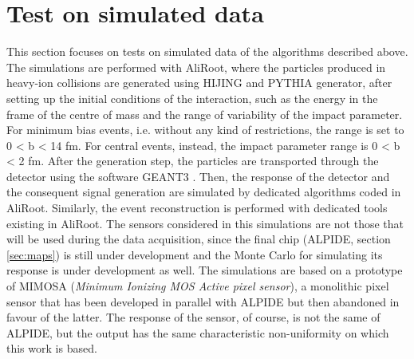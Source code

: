 \section{Test on simulated data}
This section focuses on tests on simulated data of the algorithms described above. The simulations are performed with AliRoot, where the particles produced in heavy-ion collisions are generated using HIJING \cite{hijing} and PYTHIA \cite{pythia} generator, after setting up the initial conditions of the interaction, such as the energy in the frame of the centre of mass and the range of variability of the impact parameter. For minimum bias events, i.e. without any kind of restrictions, the range is set to 0 < b < 14 fm. For central events, instead, the impact parameter range is 0 < b < 2 fm. After the generation step, the particles are transported through the detector using the software GEANT3 \cite{geant}. Then, the response of the detector and the consequent signal generation are simulated by dedicated algorithms coded in AliRoot. Similarly, the event reconstruction is performed with dedicated tools existing in AliRoot. The sensors considered in this simulations are not those that will be used during the data acquisition, since the final chip (ALPIDE, section \ref{sec:maps}) is still under development and the Monte Carlo for simulating its response is under development as well. The simulations are based on a prototype of MIMOSA (\textit{Minimum Ionizing MOS Active pixel sensor}), a monolithic pixel sensor that has been developed in parallel with ALPIDE but then abandoned in favour of the latter. The response of the sensor, of course, is not the same of ALPIDE, but the output has the same characteristic non-uniformity on which this work is based.\\ 
%
